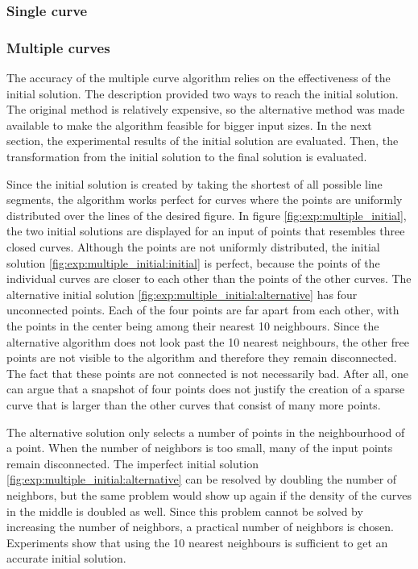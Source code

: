 \documentclass[11pt]{article}
\begin{document}
\subsubsection{Single curve}

\subsubsection{Multiple curves}
The accuracy of the multiple curve algorithm relies on the effectiveness of the initial solution. The description provided two ways to reach the initial solution. The original method is relatively expensive, so the alternative method was made available to make the algorithm feasible for bigger input sizes. In the next section, the experimental results of the initial solution are evaluated. Then, the transformation from the initial solution to the final solution is evaluated.

Since the initial solution is created by taking the shortest of all possible line segments, the algorithm works perfect for curves where the points are uniformly distributed over the lines of the desired figure.
In figure \ref{fig:exp:multiple_initial}, the two initial solutions are displayed for an input of points that resembles three closed curves. Although the points are not uniformly distributed, the initial solution \ref{fig:exp:multiple_initial:initial} is perfect, because the points of the individual curves are closer to each other than the points of the other curves.
The alternative initial solution \ref{fig:exp:multiple_initial:alternative} has four unconnected points. Each of the four points are far apart from each other, with the points in the center being among their nearest 10 neighbours. Since the alternative algorithm does not look past the 10 nearest neighbours, the other free points are not visible to the algorithm and therefore they remain disconnected.
The fact that these points are not connected is not necessarily bad. After all, one can argue that a snapshot of four points does not justify the creation of a sparse curve that is larger than the other curves that consist of many more points.

The alternative solution only selects a number of points in the neighbourhood of a point. When the number of neighbors is too small, many of the input points remain disconnected. The imperfect initial solution \ref{fig:exp:multiple_initial:alternative} can be resolved by doubling the number of neighbors, but the same problem would show up again if the density of the curves in the middle is doubled as well. Since this problem cannot be solved by increasing the number of neighbors, a practical number of neighbors is chosen.
Experiments show that using the 10 nearest neighbours is sufficient to get an accurate initial solution.
\end{document}
